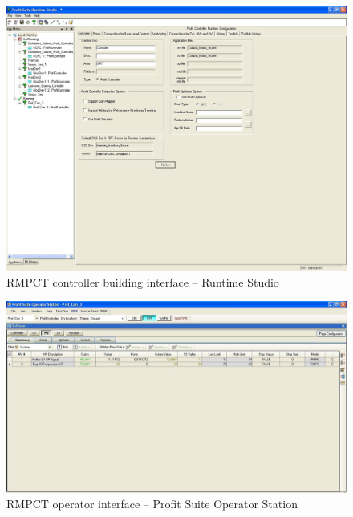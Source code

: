 \begin{landscape}
  \begin{figure}[htbp]
    \centering
      \includegraphics[width=20cm]{graph/ss_rmpctruntimestudio.jpg}
    \caption[RMPCT Runtime Studio interface]{RMPCT controller building interface -- Runtime Studio}
    \label{fig:ssrmpctcontrolbuild}
  \end{figure}

  \begin{figure}[htbp]
    \centering
      \includegraphics[width=25cm]{graph/ss_rmpctpsos.jpg}
    \caption[RMPCT Profit Suite Operator Station interface]{RMPCT operator interface -- Profit Suite Operator Station}
    \label{fig:ssrmpctoperator}
  \end{figure}


\end{landscape}
